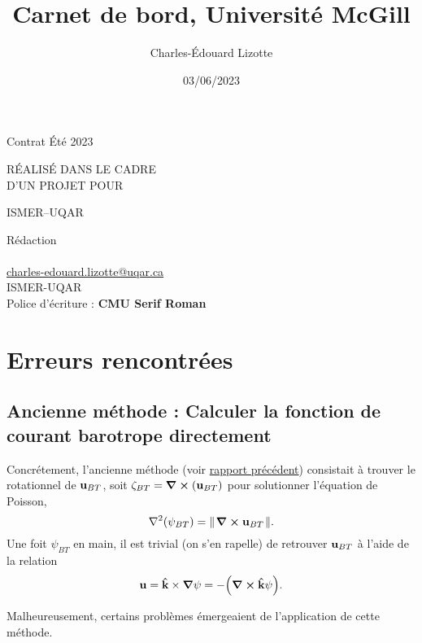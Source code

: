\documentclass[10pt]{article}
\author{Charles-Édouard Lizotte}
\date{03/06/2023}
\title{Carnet de bord, Université McGill}
\makeatletter
\numberwithin{equation}{section}
\newcommand{\kvf}{\vb{\hat{k}}}
\newcommand{\uu}{\vb{u}}
\newcommand{\pt}{\hspace{1pt}} %
\newcommand{\mytitlepage}{
\begin{titlepage}
\begin{center}
{\Huge \thesubtitle \par}
\vspace{2cm}
{\Huge \MakeUppercase{\thetitle} \par}
\vspace{2cm}
RÉALISÉ DANS LE CADRE\\ D'UN PROJET POUR \par
\vspace{2cm}
{\Huge ISMER--UQAR \par}
\vspace{2cm}
{\thedate}
\end{center}
\vfill
Rédaction \\
{\theauthor}\\
\url{charles-edouard.lizotte@uqar.ca}\\
ISMER-UQAR\\
Police d'écriture : \textbf{CMU Serif Roman}
\end{titlepage}
}
\newcommand{\thesubtitle}{Contrat Été 2023}
\makeatother
\begin{document}
\mytitlepage
\tableofcontents\newpage

\section{Erreurs rencontrées}
\label{sec:org8336a2a}

\subsection{Ancienne méthode : Calculer la fonction de courant barotrope directement}
\label{sec:orge251cd8}
Concrétement, l'ancienne méthode (voir \href{rapport-2023-04-28.org}{rapport précédent}) consistait à trouver le rotationnel de \(\uu_{BT}\), soit \(\zeta_{BT} = \curl(\uu_{BT})\) pour solutionner l'équation de Poisson,
\begin{equation}
\label{eq:org9792dab}
   \laplacian(\psi_{BT}) =  \norm{\pt\curl{\uu_{BT}}\pt}.
\end{equation}
Une foit \(\psi_{BT}\) en main, il est trivial (on s'en rapelle) de retrouver \(\uu_{BT}\) à l'aide de la relation
\begin{equation}
   \uu = \kvf\times\gradient{\psi} = - \qty(\curl{\kvf\psi}).
\end{equation}

Malheureusement, certains problèmes émergeaient de l'application de cette méthode.
\end{document}
